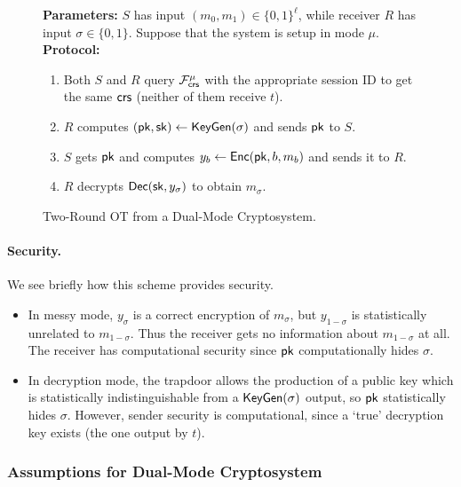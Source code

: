 \begin{figure}[h]
	\begin{mdframed}[
		linecolor=black,
		linewidth=1pt,
		roundcorner=5pt,
		backgroundcolor=white,
		userdefinedwidth=\textwidth,
		]
		\vspace{2mm}
		\textbf{Parameters:} $S$ has input $(m_0, m_1)\in\{0,1\}^\ell$, while receiver $R$ has input $\sigma\in\{0,1\}$. Suppose that the system is setup in mode $\mu$.\\
		
		\textbf{Protocol:}
		\begin{enumerate}
			\item Both $S$ and $R$ query $\mathcal{F}^{\mu}_{\mathsf{crs}}$ with the appropriate session ID to get the same $\mathsf{crs}$ (neither of them receive $t$).
			\item $R$ computes $(\mathsf{pk}, \mathsf{sk})\gets\mathsf{KeyGen}(\sigma)$ and sends $\mathsf{pk}$ to $S$.
			\item $S$ gets $\mathsf{pk}$ and computes $y_b\gets\mathsf{Enc}(\mathsf{pk},b,m_b)$ and sends it to $R$.
			\item $R$ decrypts $\mathsf{Dec}(\mathsf{sk},y_\sigma)$ to obtain $m_\sigma$.
		\end{enumerate}
		\vspace{2mm}
	\end{mdframed}
	\caption{Two-Round OT from a Dual-Mode Cryptosystem.}
	\label{fig:dmmodeot}
\end{figure}

\paragraph{Security.} We see briefly how this scheme provides security.
\begin{itemize}
	\item In messy mode, $y_\sigma$ is a correct encryption of $m_\sigma$, but $y_{1-\sigma}$ is statistically unrelated to $m_{1-\sigma}$. Thus the receiver gets no information about $m_{1-\sigma}$ at all. The receiver has computational security since $\mathsf{pk}$ computationally hides $\sigma$.
	\item In decryption mode, the trapdoor allows the production of a public key which is statistically indistinguishable from a $\mathsf{KeyGen}(\sigma)$ output, so $\mathsf{pk}$ statistically hides $\sigma$. However, sender security is computational, since a `true' decryption key exists (the one output by $t$).
\end{itemize}

\subsubsection{Assumptions for Dual-Mode Cryptosystem}

